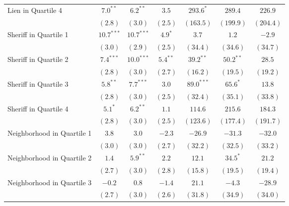 \begin{center}
\begin{longtable}{l c c c c c c }
Lien in Quartile 4         & $7.0^{**}$    & $6.2^{**}$    & $3.5$        & $293.6^{*}$   & $289.4$        & $226.9$        \\
                           & $(2.8)$       & $(3.0)$       & $(2.5)$      & $(163.5)$     & $(199.9)$      & $(204.4)$      \\
Sheriff in Quartile 1      & $10.7^{***}$  & $10.7^{***}$  & $4.9^{*}$    & $3.7$         & $1.2$          & $-2.9$         \\
                           & $(3.0)$       & $(2.9)$       & $(2.5)$      & $(34.4)$      & $(34.6)$       & $(34.7)$       \\
Sheriff in Quartile 2      & $7.4^{***}$   & $10.0^{***}$  & $5.4^{**}$   & $39.2^{**}$   & $50.2^{**}$    & $28.5$         \\
                           & $(2.8)$       & $(3.0)$       & $(2.7)$      & $(16.2)$      & $(19.5)$       & $(19.2)$       \\
Sheriff in Quartile 3      & $5.8^{**}$    & $7.7^{***}$   & $3.0$        & $89.0^{***}$  & $65.6^{*}$     & $13.8$         \\
                           & $(2.8)$       & $(3.0)$       & $(2.5)$      & $(32.4)$      & $(35.1)$       & $(33.8)$       \\
Sheriff in Quartile 4      & $5.1^{*}$     & $6.2^{**}$    & $1.1$        & $114.6$       & $215.6$        & $184.3$        \\
                           & $(2.8)$       & $(3.0)$       & $(2.5)$      & $(123.6)$     & $(177.4)$      & $(191.7)$      \\
Neighborhood in Quartile 1 & $3.8$         & $3.0$         & $-2.3$       & $-26.9$       & $-31.3$        & $-32.0$        \\
                           & $(3.0)$       & $(3.0)$       & $(2.7)$      & $(32.2)$      & $(32.5)$       & $(33.2)$       \\
Neighborhood in Quartile 2 & $1.4$         & $5.9^{**}$    & $2.2$        & $12.1$        & $34.5^{*}$     & $21.2$         \\
                           & $(2.7)$       & $(3.0)$       & $(2.8)$      & $(15.8)$      & $(19.5)$       & $(19.4)$       \\
Neighborhood in Quartile 3 & $-0.2$        & $0.8$         & $-1.4$       & $21.1$        & $-4.3$         & $-28.9$        \\
                           & $(2.7)$       & $(3.0)$       & $(2.6)$      & $(31.8)$      & $(34.9)$       & $(34.0)$       \\

\end{longtable}
\end{center}
